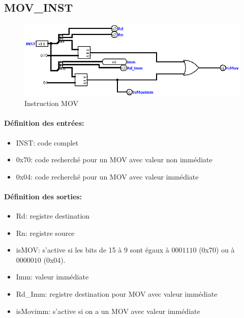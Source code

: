 \documentclass[a4paper]{article} %
\begin{document}
\subsection{MOV\_INST}

\begin{figure}[H]
    \centering
    \includegraphics[width=.8\textwidth]{src/MOV_INST.png}
    \caption{Instruction MOV}
    \label{mov_img}
\end{figure}
\paragraph{Définition des entrées:}
\begin{itemize}
    \item     INST: code complet
    \item     0x70: code recherché pour un MOV avec valeur non immédiate
    \item     0x04: code recherché pour un MOV avec valeur immédiate
\end{itemize}

\paragraph{Définition des sorties:}
\begin{itemize}
    \item     Rd: registre destination
    \item     Rn: registre source
    \item     isMOV: s'active si les bits de 15 à 9 sont égaux à $0001110$ (0x70) ou à $0000010$ (0x04).
    \item     Imm: valeur immédiate
    \item     Rd\_Imm: registre destination pour MOV avec valeur immédiate
    \item     isMovimm: s'active si on a un MOV avec valeur immédiate

\end{itemize}

\medskip
\end{document}
